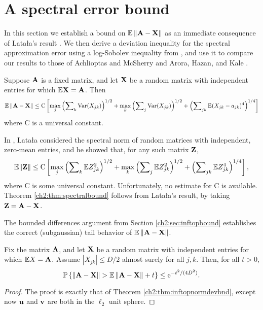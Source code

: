\section{A spectral error bound}

\label{ch2:sec:spectralerrbound}

In this section we establish a bound on $\mathbb{E}\left\|\mathbf{A}-\mathbf{X}\right\|$ as an
immediate consequence of Lata\l{}a's result \cite{Lat04}. We then derive a
deviation inequality for the spectral approximation error using a log-Sobolev
inequality from \cite{BLM03}, and use it to compare our results to those of
Achlioptas and McSherry \cite{AM07} and Arora, Hazan, and Kale \cite{AHK06}.

\begin{thm}
Suppose $\mathbf{A}$ is a fixed matrix, and let $\mathbf{X}$ be a random matrix with
independent entries for which $\mathbb{E} \mathbf{X}=\mathbf{A}$. Then 
\[
\mathbb{E}\left\|\mathbf{A}-\mathbf{X}\right\|\leq\mathrm{C}\left[\max_{j}\left(\sum\nolimits_{k}\operatorname{Var}(
X_{jk})\right)^{1/2}+\max_{k}\left(\sum\nolimits_{j}\operatorname{Var}(X_{jk})\right)^{1/2}
+\left(\sum\nolimits_{jk}\mathbb{E}(X_{jk}-a_{jk})^{4}\right)^{1/4}\right]
\]
where $\mathrm{C}$ is a universal constant.
\label{ch2:thm:spectralbound}
\end{thm}
In \cite{Lat04}, Lata\l{}a considered the spectral norm of random matrices with
independent, zero-mean entries, and he showed that, for any such matrix
$\mathbf{Z}$, 
\[
\mathbb{E}\Vert\mathbf{Z}\Vert\leq\mathrm{C}\left[\max_{j}\left(\sum\nolimits_{k}\mathbb{E}
Z_{jk}^{2}\right)^{1/2}+\max_{k}\left(\sum\nolimits_{j}\mathbb{E}
Z_{jk}^{2}\right)^{1/2}+\left(\sum\nolimits_{jk}\mathbb{E}
Z_{jk}^{4}\right)^{1/4}\right],
\]
where $\mathrm{C}$ is some universal constant. Unfortunately, no estimate for
$\mathrm{C}$ is available. Theorem \ref{ch2:thm:spectralbound} follows from
Lata\l{}a's result, by taking $\mathbf{Z}=\mathbf{A}-\mathbf{X}$.

The bounded differences argument from Section \ref{ch2:sec:inftopbound} establishes
the correct (subgaussian) tail behavior of $\mathbb{E}\left\|\mathbf{A}-\mathbf{X}\right\|$.

\begin{thm}
Fix the matrix $\mathbf{A}$, and let $\mathbf{X}$ be a random matrix with independent
entries for which $\mathbb{E} X = \mathbf{A}$. Assume $\left|X_{jk}\right|\leq D/2$ almost
surely for all $j,k$. Then, for all $t>0$,
\[
\Prob{\norm{\mat{A}-\mat{X}}>\E\norm{\mat{A} - \mat{X}}+t}\leq
\e^{-t^{2}/(4D^{2})}.
\]
\label{ch2:thm:normconcentration}
\end{thm}
\begin{proof}
The proof is exactly that of Theorem \ref{ch2:thm:inftopnormdevbnd}, except now
$\mathbf{u}$ and $\mathbf{v}$ are both in the $\ell_2$ unit sphere.
\end{proof}

